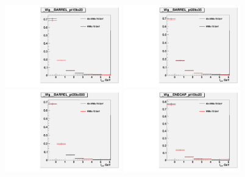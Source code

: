 \begin{figure}[htb]
  \begin{center}
  \includegraphics[width=0.45\textwidth]{../figs/figs_v11/ChannelsMERGED_WGamma/QuickChecks/cTemplatesVsWMt_Wg_phoPFChIsoCorr_BARREL_pt15to20.pdf} \includegraphics[width=0.45\textwidth]{../figs/figs_v11/ChannelsMERGED_WGamma/QuickChecks/cTemplatesVsWMt_Wg_phoPFChIsoCorr_BARREL_pt20to35.pdf} \\
  \includegraphics[width=0.45\textwidth]{../figs/figs_v11/ChannelsMERGED_WGamma/QuickChecks/cTemplatesVsWMt_Wg_phoPFChIsoCorr_BARREL_pt35to500.pdf}  \includegraphics[width=0.45\textwidth]{../figs/figs_v11/ChannelsMERGED_WGamma/QuickChecks/cTemplatesVsWMt_Wg_phoPFChIsoCorr_ENDCAP_pt15to20.pdf} \\

\end{center}
\end{figure}
